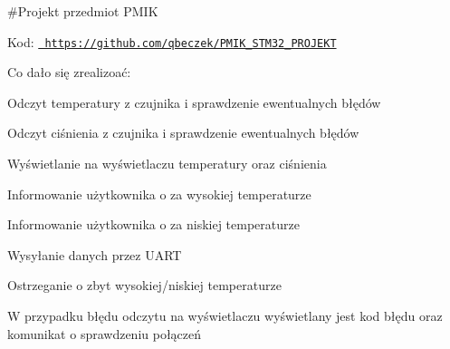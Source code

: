 \#\+Projekt przedmiot PMIK

Kod\+: \href{https://github.com/qbeczek/PMIK_STM32_PROJEKT}{\texttt{ https\+://github.\+com/qbeczek/\+PMIK\+\_\+\+STM32\+\_\+\+PROJEKT}}

Co dało się zrealizoać\+:
\begin{DoxyEnumerate}
\item Odczyt temperatury z czujnika i sprawdzenie ewentualnych błędów
\item Odczyt ciśnienia z czujnika i sprawdzenie ewentualnych błędów
\item Wyświetlanie na wyświetlaczu temperatury oraz ciśnienia
\item Informowanie użytkownika o za wysokiej temperaturze
\item Informowanie użytkownika o za niskiej temperaturze
\item Wysyłanie danych przez UART
\item Ostrzeganie o zbyt wysokiej/niskiej temperaturze
\item W przypadku błędu odczytu na wyświetlaczu wyświetlany jest kod błędu oraz komunikat o sprawdzeniu połączeń 
\end{DoxyEnumerate}